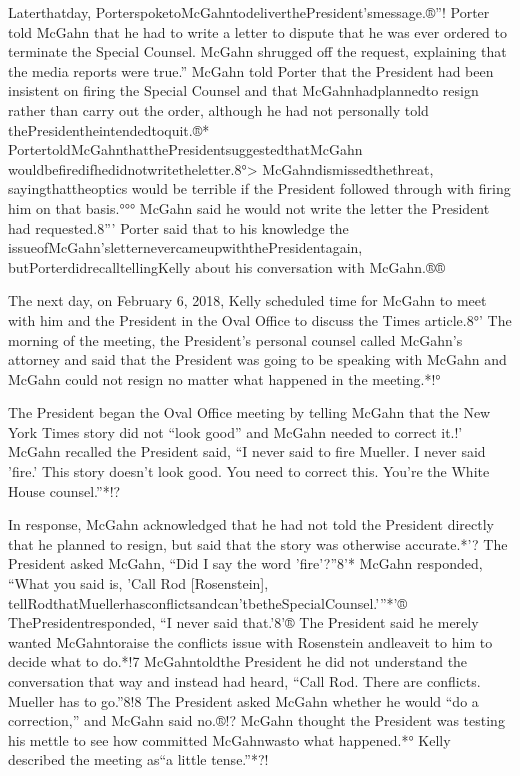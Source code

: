 Laterthatday, PorterspoketoMcGahntodeliverthePresident'smessage.®”!
Porter told McGahn that he had to write a letter to dispute that he was ever ordered to terminate the Special Counsel.
McGahn shrugged off the request, explaining that the media reports were true.”
McGahn told Porter that the President had been insistent on firing the Special Counsel and that McGahnhadplannedto resign rather than carry out the order, although he had not personally told thePresidentheintendedtoquit.®*
PortertoldMcGahnthatthePresidentsuggestedthatMcGahn wouldbefiredifhedidnotwritetheletter.8°>
McGahndismissedthethreat, sayingthattheoptics would be terrible if the President followed through with firing him on that basis.°°°
McGahn said he would not write the letter the President had requested.8”'
Porter said that to his knowledge the
issueofMcGahn'sletternevercameupwiththePresidentagain, butPorterdidrecalltellingKelly about his conversation with McGahn.®®

The next day, on February 6, 2018, Kelly scheduled time for McGahn to meet with him and the President in the Oval Office to discuss the Times article.8°'
The morning of the meeting, the President's personal counsel called McGahn's attorney and said that the President was going to be speaking with McGahn and McGahn could not resign no matter what happened in the meeting.*!°

The President began the Oval Office meeting by telling McGahn that the New York Times story did not “look good” and McGahn needed to correct it.!'
McGahn recalled the President said, “I never said to fire Mueller.
I never said 'fire.'
This story doesn't look good.
You need to correct this.
You're the White House counsel.”*!?

In response, McGahn acknowledged that he had not told the President directly that he planned to resign, but said that the story was otherwise accurate.*'?
The President asked McGahn, “Did I say the word 'fire'?”8'*
McGahn responded, “What you said is, 'Call Rod [Rosenstein], tellRodthatMuellerhasconflictsandcan'tbetheSpecialCounsel.'”*'®
ThePresidentresponded, “I never said that.'8'®
The President said he merely wanted McGahntoraise the conflicts issue with Rosenstein andleaveit to him to decide what to do.*!7
McGahntoldthe President he did not understand the conversation that way and instead had heard, “Call Rod.
There are conflicts.
Mueller has to go.”8!8
The President asked McGahn whether he would “do a correction,” and McGahn said no.®!?
McGahn thought the President was testing his mettle to see how committed McGahnwasto what happened.*°
Kelly described the meeting as“a little tense.”*?!

